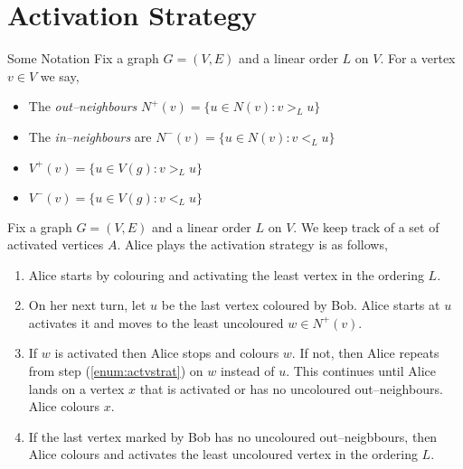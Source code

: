 \documentclass{beamer}
\begin{document}
\section{Activation Strategy}

\begin{frame}{\secname}{Some Notation}
Fix a graph $G=(V,E)$ and a linear order $L$ on $V$. For a vertex $v\in V$ we say,
\begin{itemize}        
    \item The \textit{out--neighbours} $N^+(v)=\{u\in N(v):v>_L u\}$ 
    \item The \textit{in--neighbours} are $N^-(v)=\{u\in N(v):v<_L u\}$ 
    \item $V^+(v)=\{u\in V(g):v>_L u\}$     
    \item $V^-(v)=\{u\in V(g):v<_L u\}$ 
\end{itemize}
\end{frame}


\begin{frame}{\secname}
    Fix a graph $G=(V,E)$ and a linear order $L$ on $V$. We keep track of a set of activated vertices $A$. Alice plays the activation strategy is as follows,
    \begin{enumerate}
        \item Alice starts by colouring and activating the least vertex in the ordering $L$.
        \pause
        \item On her next turn, let $u$ be the last vertex coloured by Bob.  Alice starts at $u$ activates it and moves to the least uncoloured $w\in N^+(v)$.
        \pause \label{enum:actvstrat}
        \item If $w$ is activated then Alice stops and colours $w$. If not, then Alice repeats from step (\ref{enum:actvstrat}) on $w$ instead of $u$. 
        This continues until Alice lands on a vertex $x$ that is activated or has no uncoloured out--neighbours. Alice colours $x$.
        \pause
        \item If the last vertex marked by Bob has no uncoloured out--neigbbours, then Alice colours and activates the least uncoloured vertex in the ordering $L$.
    \end{enumerate}
\end{frame}

\end{document}
